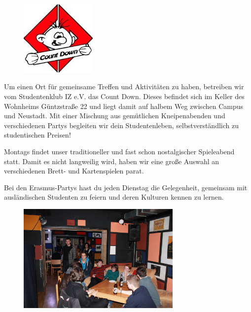 
\begin{figure}%
  \vspace{-.5cm}
  \begin{centering}
    \includegraphics[width=3.7cm]{img/countdown.jpg}
  \end{centering}%
  \vspace{-.5cm}
\end{figure}

Um einen Ort für gemeinsame Treffen und Aktivitäten zu haben, betreiben wir vom Studentenklub IZ e.V. das Count Down.
Dieses befindet sich im Keller des Wohnheims Güntzstraße 22 und liegt damit auf halbem Weg zwischen Campus und Neustadt.
Mit einer Mischung aus gemütlichen Kneipenabenden und verschiedenen Partys begleiten wir dein Studentenleben, selbstverständlich zu studentischen Preisen!

Montags findet unser traditioneller und fast schon nostalgischer Spieleabend statt.
Damit es nicht langweilig wird, haben wir eine große Auswahl an verschiedenen Brett- und Kartenspielen parat.

Bei den Erasmus-Partys hast du jeden Dienstag die Gelegenheit, gemeinsam mit ausländischen Studenten zu feiern und deren Kulturen kennen zu lernen.

\begin{figure}%
  \vspace{-.5cm}
  \begin{centering}
    \includegraphics[width=8cm]{img/ese2013/cd.jpg}
  \end{centering}
  \vspace{-1cm}
\end{figure}

